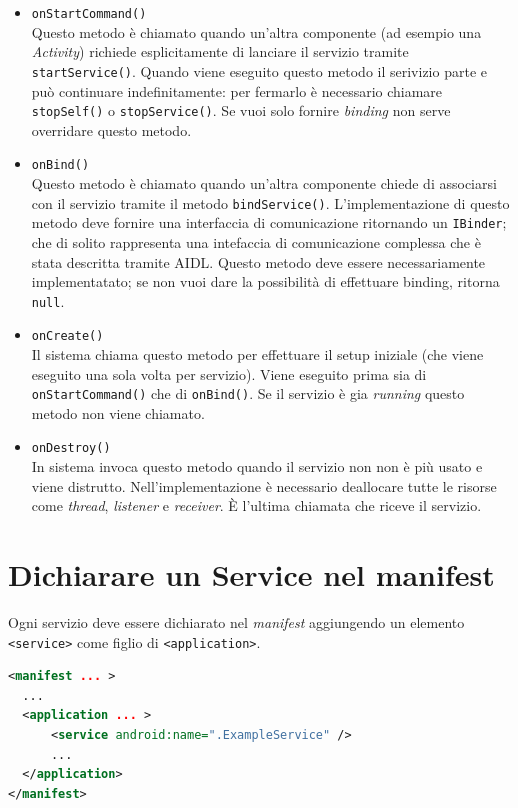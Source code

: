 \begin{itemize}
	\item \texttt{onStartCommand()}\\
	Questo metodo è chiamato quando un'altra componente (ad esempio una \textit{Activity}) richiede esplicitamente di lanciare il servizio tramite \texttt{startService()}. Quando viene eseguito questo metodo il serivizio parte e può continuare indefinitamente: per fermarlo è necessario chiamare \texttt{stopSelf()} o \texttt{stopService()}. Se vuoi solo fornire \textit{binding} non serve overridare questo metodo.
	\item \texttt{onBind()}\\
	Questo metodo è chiamato quando un'altra componente chiede di associarsi con il servizio tramite il metodo \texttt{bindService()}. L'implementazione di questo metodo deve fornire una interfaccia di comunicazione ritornando un \texttt{IBinder}; che di solito rappresenta una intefaccia di comunicazione complessa che è stata descritta tramite AIDL. Questo metodo deve essere necessariamente implementatato; se non vuoi dare la possibilità di effettuare binding, ritorna \texttt{null}.
	\item \texttt{onCreate()}\\
	Il sistema chiama questo metodo per effettuare il setup iniziale (che viene eseguito una sola volta per servizio). Viene eseguito prima sia di \texttt{onStartCommand()} che di \texttt{onBind()}. Se il servizio è gia \textit{running} questo metodo non viene chiamato.
	\item \texttt{onDestroy()}\\
	In sistema invoca questo metodo quando il servizio non non è più usato e viene distrutto. Nell'implementazione è necessario deallocare tutte le risorse come \textit{thread}, \textit{listener} e \textit{receiver}. È l'ultima chiamata che riceve il servizio.
\end{itemize}

\section{Dichiarare un Service nel manifest}
Ogni servizio deve essere dichiarato nel \textit{manifest} aggiungendo un elemento \texttt{<service>} come figlio di \texttt{<application>}.
\begin{lstlisting}[language=XML]
<manifest ... >
  ...
  <application ... >
      <service android:name=".ExampleService" />
      ...
  </application>
</manifest>
\end{lstlisting}

